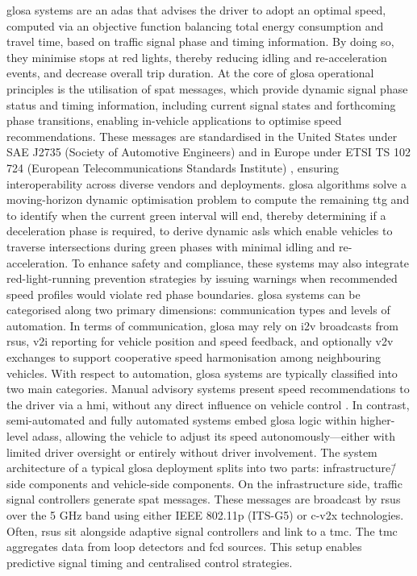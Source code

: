 \ac{glosa} systems are an \ac{adas} that advises the driver to adopt an optimal speed, computed via an objective function balancing total energy consumption and travel time, based on traffic signal phase and timing information. By doing so, they minimise stops at red lights, thereby reducing idling and re-acceleration events, and decrease overall trip duration. \cite{RealTimeGLOSA2020}
\mynewline
At the core of \ac{glosa} operational principles is the utilisation of \ac{spat} messages, which provide dynamic signal phase status and timing information, including current signal states and forthcoming phase transitions, enabling in-vehicle applications to optimise speed recommendations. These messages are standardised in the United States under SAE J2735 (Society of Automotive Engineers) \cite{USDOTSPaT2022} and in Europe under ETSI TS 102 724 (European Telecommunications Standards Institute) \cite{ETSI1027242012}, ensuring interoperability across diverse vendors and deployments. \ac{glosa} algorithms solve a moving-horizon dynamic optimisation problem to compute the remaining \ac{ttg} and to identify when the current green interval will end, thereby determining if a deceleration phase is required, to derive dynamic \acp{asl} which enable vehicles to traverse intersections during green phases with minimal idling and re-acceleration. To enhance safety and compliance, these systems may also integrate red-light-running prevention strategies by issuing warnings when recommended speed profiles would violate red phase boundaries. \cite{BusesGLOSA2022}
\mynewline
\ac{glosa} systems can be categorised along two primary dimensions: communication types and levels of automation. In terms of communication, \ac{glosa} may rely on \ac{i2v} broadcasts from \acp{rsu}, \ac{v2i} reporting for vehicle position and speed feedback, and optionally \ac{v2v} exchanges to support cooperative speed harmonisation among neighbouring vehicles. \cite{Seredynski2013} With respect to automation, \ac{glosa} systems are typically classified into two main categories. Manual advisory systems present speed recommendations to the driver via a \ac{hmi}, without any direct influence on vehicle control \cite{BusesGLOSA2022}. In contrast, semi-automated and fully automated systems embed \ac{glosa} logic within higher-level \acp{adas}, allowing the vehicle to adjust its speed autonomously—either with limited driver oversight or entirely without driver involvement. \cite{Almannaa2019}
\mynewline
The system architecture of a typical \ac{glosa} deployment splits into two parts: infrastructure\=/side components and vehicle-side components. On the infrastructure side, traffic signal controllers generate \ac{spat} messages. These messages are broadcast by \acp{rsu} over the 5 GHz band using either IEEE 802.11p (ITS-G5) or \ac{c-v2x} technologies. Often, \acp{rsu} sit alongside adaptive signal controllers and link to a \ac{tmc}. The \ac{tmc} aggregates data from loop detectors and \ac{fcd} sources. This setup enables predictive signal timing and centralised control strategies.
